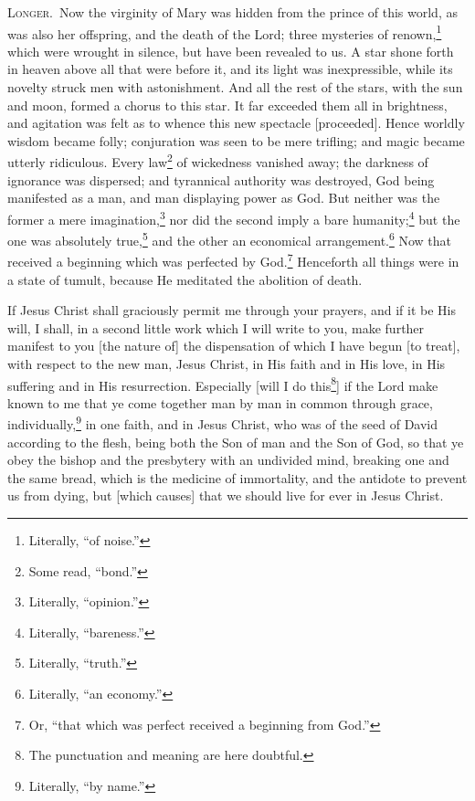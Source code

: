\textsc{Longer.}~Now the virginity of Mary was hidden from the prince of this world, as was also her offspring, and the death of the Lord; three mysteries of renown,\footnote{Literally, “of noise.”} which were wrought in silence, but have been revealed to us. A star shone forth in heaven above all that were before it, and its light was inexpressible, while its novelty struck men with astonishment. And all the rest of the stars, with the sun and moon, formed a chorus to this star. It far exceeded them all in brightness, and agitation was felt as to whence this new spectacle [proceeded]. Hence worldly wisdom became folly; conjuration was seen to be mere trifling; and magic became utterly ridiculous. Every law\footnote{Some read, “bond.”} of wickedness vanished away; the darkness of ignorance was dispersed; and tyrannical authority was destroyed, God being manifested as a man, and man displaying power as God. But neither was the former a mere imagination,\footnote{Literally, “opinion.”} nor did the second imply a bare humanity;\footnote{Literally, “bareness.”} but the one was absolutely true,\footnote{Literally, “truth.”} and the other an economical arrangement.\footnote{Literally, “an economy.”} Now that received a beginning which was perfected by God.\footnote{Or, “that which was perfect received a beginning from God.”} Henceforth all things were in a state of tumult, because He meditated the abolition of death.


If Jesus Christ shall graciously permit me through your prayers, and if it be His will, I shall, in a second little work which I will write to you, make further manifest to you [the nature of] the dispensation of which I have begun [to treat], with respect to the new man, Jesus Christ, in His faith and in His love, in His suffering and in His resurrection. Especially [will I do this\footnote{The punctuation and meaning are here doubtful.}] if the Lord make known to me that ye come together  man by man in common through grace, individually,\footnote{Literally, “by name.”} in one faith, and in Jesus Christ, who was of the seed of David according to the flesh, being both the Son of man and the Son of God, so that ye obey the bishop and the presbytery with an undivided mind, breaking one and the same bread, which is the medicine of immortality, and the antidote to prevent us from dying, but [which causes] that we should live for ever in Jesus Christ.


